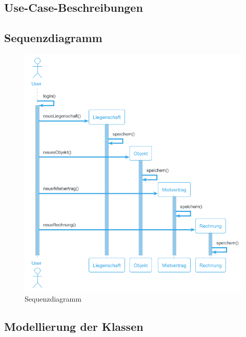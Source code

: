 \subsection{Use-Case-Beschreibungen}


\subsection{Sequenzdiagramm}
\begin{figure}[H]
  \begin{center}
    \includegraphics[width=1\linewidth]{content/diagrams/out/sequenzdiagram/sequenzdiagram.png}
    \caption{Sequenzdiagramm}
    \label{sequenzdiagram}
  \end{center}
\end{figure}

\newpage
\subsection{Modellierung der Klassen}
